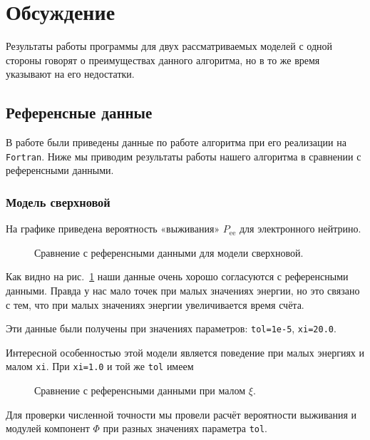 \documentclass[12pt]{article}
\begin{document}
\section{Обсуждение}

Результаты работы программы для двух рассматриваемых моделей с одной стороны
говорят о преимуществах данного алгоритма, но в то же время указывают на его
недостатки.

\subsection*{Референсные данные}

В работе \cite{casas2016} были приведены данные по работе алгоритма при его
реализации на
\verb|Fortran|. %
Ниже мы приводим результаты работы нашего алгоритма в сравнении с референсными
данными.

\subsubsection*{Модель сверхновой}

На графике приведена вероятность «выживания» \(P_{\text{ee}}\) для электронного
нейтрино.

\begin{figure}[htb]
  \hspace*{-2em}
  \caption{\label{fig:1}Сравнение с референсными данными для модели сверхновой.}
\end{figure}

Как видно на рис.~\ref{fig:1} наши данные очень хорошо согласуются с
референсными данными. Правда у нас мало точек при малых значениях энергии, но
это связано с тем, что при малых значениях энергии увеличивается время счёта.

Эти данные были получены при значениях параметров: \verb|tol=1e-5|,
\verb|xi=20.0|.

Интересной особенностью этой модели является поведение при малых энергиях и
малом \verb|xi|. При \verb|xi=1.0| и той же \verb|tol| имеем
\begin{figure}[htb]
  \hspace*{-2em}
  \caption{\label{fig:3}Сравнение с референсными данными при малом \(\xi\).}
\end{figure}

Для проверки численной точности мы провели расчёт вероятности выживания и
модулей компонент \(\Phi\) при разных значениях параметра \verb|tol|.
\end{document}
